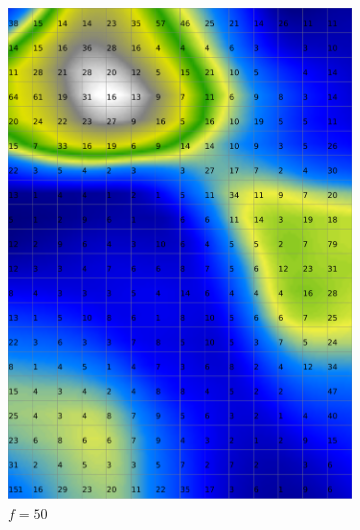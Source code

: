 \documentclass{acm_proc_article-sp}
\begin{document}
\begin{figure}
\begin{subfigure}[b]{0.30\linewidth}
        \includegraphics[width=\linewidth]{img/wine-weird-smoothed-data-histogram-50}
        \caption{$f=50$}
    \end{subfigure}
    \begin{subfigure}[b]{0.30\linewidth}

\end{subfigure}
\end{figure}
\end{document}
